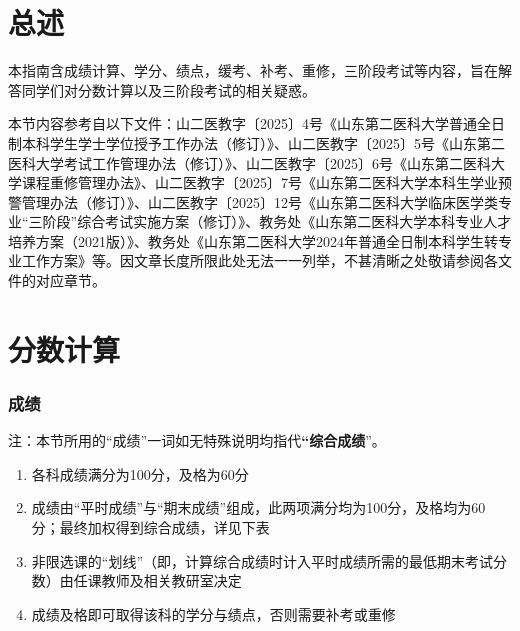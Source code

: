 \part[总述]{总述}
本指南含成绩计算、学分、绩点，缓考、补考、重修，三阶段考试等内容，旨在解答同学们对分数计算以及三阶段考试的相关疑惑。

本节内容参考自以下文件：山二医教字〔2025〕4号《山东第二医科大学普通全日制本科学生学士学位授予工作办法（修订）》、山二医教字〔2025〕5号《山东第二医科大学考试工作管理办法（修订）》、山二医教字〔2025〕6号《山东第二医科大学课程重修管理办法》、山二医教字〔2025〕7号《山东第二医科大学本科生学业预警管理办法（修订）》、山二医教字〔2025〕12号《山东第二医科大学临床医学类专业“三阶段”综合考试实施方案（修订）》、教务处《山东第二医科大学本科专业人才培养方案（2021版）》、教务处《山东第二医科大学2024年普通全日制本科学生转专业工作方案》等。因文章长度所限此处无法一一列举，不甚清晰之处敬请参阅各文件的对应章节。

\newpage
\part[分数计算]{分数计算}

\section[成绩]{成绩}
\label{score}
注：本节所用的“成绩”一词如无特殊说明均指代\textbf{“综合成绩}”。
\begin{enumerate}
    \item 各科成绩满分为100分，及格为60分
    \item 成绩由“平时成绩”与“期末成绩”组成，此两项满分均为100分，及格均为60分；最终加权得到综合成绩，详见下表
    \item 非限选课的“划线”（即，计算综合成绩时计入平时成绩所需的最低期末考试分数）由任课教师及相关教研室决定
    \item 成绩及格即可取得该科的学分与绩点，否则需要补考或重修
\end{enumerate}

\noindent{}

